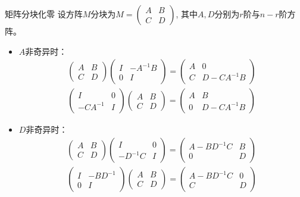 \begin{frame}

\begin{block}{矩阵分块化零}
设方阵$M$分块为\(\displaystyle M = \begin{pmatrix} A & B \\ C & D \end{pmatrix}\), 其中$A, D$分别为$r$阶与$n-r$阶方阵。
\begin{itemize}
\item $A$非奇异时：
\begin{align*}
\begin{pmatrix} A & B \\ C & D \end{pmatrix} \begin{pmatrix} I & -A^{-1}B \\ 0 & I \end{pmatrix} = \begin{pmatrix} A & 0 \\ C & D-CA^{-1}B \end{pmatrix} \\
\begin{pmatrix} I & 0 \\ -CA^{-1} & I \end{pmatrix} \begin{pmatrix} A & B \\ C & D \end{pmatrix} = \begin{pmatrix} A & B \\ 0 & D-CA^{-1}B \end{pmatrix}
\end{align*}
\item $D$非奇异时：
\begin{align*}
\begin{pmatrix} A & B \\ C & D \end{pmatrix} \begin{pmatrix} I & 0 \\ -D^{-1}C & I \end{pmatrix} = \begin{pmatrix} A-BD^{-1}C & B \\ 0 & D \end{pmatrix} \\
\begin{pmatrix} I & -BD^{-1} \\ 0 & I \end{pmatrix} \begin{pmatrix} A & B \\ C & D \end{pmatrix} = \begin{pmatrix} A-BD^{-1}C & 0 \\ C & D \end{pmatrix}
\end{align*}
\end{itemize}
\end{block}

\end{frame}

